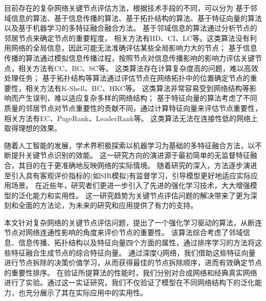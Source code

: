 \documentclass[twocolumn]{morningstar}
\begin{document}
目前存在的复杂网络关键节点评估方法，根据技术手段的不同，可以分为
基于邻域信息的算法、基于信息传播的算法、基于拓扑结构的算法、基于特征向量的算法以及基于机器学习的多特征融合融合方法。
基于邻域信息的算法通过分析节点的邻居节点来确定节点的重要程度，
相关方法有HD\cite{albert2000HD}、CI\cite{morone2015CI}、LC\cite{chen2012LC}等。这类算法没有利用网络的全局信息，因此可能无法准确评估某些全局影响力大的节点；
基于信息传播的算法通过模拟信息传播过程，按照节点对信息传播影响的影响力评估关键节点，相关方法有CC\cite{sabidussi1966CC}、BC\cite{freeman1977BC}、SC\cite{estrada2005SC}等。
这类算法存在计算复杂度高的问题，难以高效处理任务；
基于拓扑结构等算法通过评估节点在网络拓扑中的位置确定节点的重要性，相关方法有K-Shell\cite{kitsak2010K-Shell}、HC\cite{lu2016H-Index}、HKC\cite{zareie2018HKC}等。
这类算法非常容易受到网络结构等影响而产生误判，难以适应复杂多样的网络结构；
基于特征向量的算法考虑了不同质量的邻居节点对节点重要性的贡献不同，通过计算特征向量来评估节点重要性，相关方法有EC\cite{bonacich1972EC}、PageRank\cite{brin1998PageRank}、LeaderRank\cite{lu2011LeaderRank}等。
这类算法无法在连接性低的网络上取得理想的效果。

随着人工智能的发展，学术界积极探索以机器学习为基础的多特征融合方法，以不断提升关键节点识别的效能。
这一研究方向的演进源于最初简单的无监督特征融合\cite{zhao2020无监督特征融合}，其目的在于更准确地反映网络的实际情境。
随着研究的深入，方法逐步演进至引入具有客观评价指标的(如SIR模拟)有监督学习\cite{杨洋2023有监督SIR模拟}，引导模型更好地适应实际应用场景。
在近些年，研究者们更进一步引入了先进的强化学习技术\cite{fan2020FINDER}，大大增强模型的泛化能力和实用性。
这一研究趋势为关键节点评估问题的解决带来了更为深刻和全面的方法论，为未来的研究和应用提供了有力的支持。

本文针对复杂网络的关键节点评估问题，提出了一个强化学习驱动的算法，从断连节点对网络连通性影响的角度来评价节点的重要性。
该算法综合考虑了邻域信息、信息传播、拓扑结构以及特征向量四个方面的属性，通过排序学习的方法将这些特征融合生成节点的综合特征向量。
通过深度Q网络，我们借助这些特征向量进行节点拆除的决策价值学习，从而获得最佳的节点拆除顺序，进而有效确定节点的重要性排序。
在验证所提算法的性能时，我们分别对合成网络和经典真实网络进行了实验。通过这一实证研究，我们不仅验证了模型在不同网络结构下的泛化能力，也充分展示了其在实际应用中的实用性。



\end{document}
